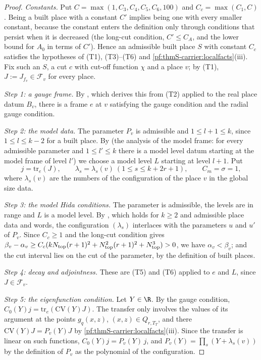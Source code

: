 \begin{proof}
\emph{Constants.} Put $C=\max(1,C_3,C_4,C_5,C_6,100)$ and $C_c=\max(C_1,C)$. Being a built place with a constant $C'$ implies
being one with every smaller constant, because the constant enters the definition only through conditions that persist
when it is decreased (the long-cut condition, $C'\le C_A$, and the lower bound for $A_0$ in terms of $C'$). Hence an admissible built place $S$ with constant $C_c$ satisfies the
hypotheses of (T1), (T3)--(T6) and \cref{pf:thmS-carrier:localfacts}(iii). Fix such an $S$, a cut $c$ with cut-off function
$\chi$ and a place $v$; by (T1), $J:=J_{f_v}\in\mathcal F_v$ for every place.

\emph{Step 1: a gauge frame.} By , which derives this from
(T2) applied to the real place datum $B_v$, there is a frame $e$ at $v$ satisfying the gauge condition and the radial gauge
condition.

\emph{Step 2: the model data.} The parameter $P_v$ is admissible and $1\le l+1\le k$, since $1\le l\le k-2$ for a built place.
By  (the analysis of the model frame: for every admissible
parameter and $1\le l'\le k$ there is a model level datum starting at the model frame of level $l'$) we choose a model level
$L$ starting at level $l+1$. Put
\[
j=\mathrm{tr}_e(J),\qquad\lambda_s=\lambda_s(v)\ (1\le s\le k+2r+1),\qquad C_m=\sigma=1,
\]
where $\lambda_s(v)$ are the numbers of the configuration of the place $v$ in the global size data.

\emph{Step 3: the model Hida conditions.} The parameter is admissible, the levels are in range and $L$ is a model level.
By , which holds for $k\ge2$ and admissible
place data and words, the configuration $(\lambda_s)$ interlaces with the parameters $u$ and $u'$ of $P_v$. Since $C_c\ge1$
and the long-cut condition gives $\beta_v-\alpha_v\ge C_c(kN_{\mathrm{top}}(r+1)^2+N_{\mathrm{top}}^2(r+1)^2+
N_{\mathrm{top}}^3)>0$, we have $\alpha_v<\beta_v$; and the cut interval lies on the cut of the parameter, by the definition of
built places.

\emph{Step 4: decay and adjointness.} These are (T5) and (T6) applied to $e$ and $L$, since $J\in\mathcal F_v$.

\emph{Step 5: the eigenfunction condition.} Let $Y\in\R$. By the gauge condition, $C_0(Y)j=\mathrm{tr}_e(\mathrm{CV}(Y)J)$. The
transfer only involves the values of its argument at the points $g_q(x,z)$, $(x,z)\in Q_{r,T_T}$, and there
$\mathrm{CV}(Y)J=P_v(Y)J$ by \cref{pf:thmS-carrier:localfacts}(iii). Since the transfer is linear on such functions,
$C_0(Y)j=P_v(Y)\,j$, and $P_v(Y)=\prod_s(Y+\lambda_s(v))$ by the definition of $P_v$ as the polynomial of the configuration.


\end{proof}
